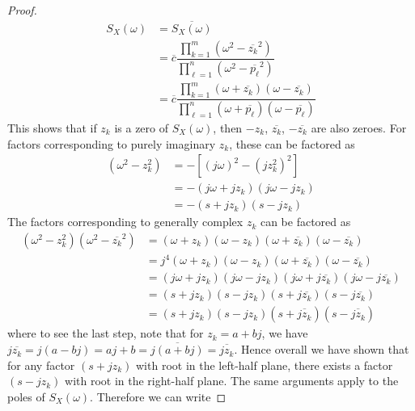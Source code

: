 \documentclass[11pt]{report} %
\begin{document}
\begin{proof}
\begin{align}
S_{X}\left(\omega\right) &= \overline{S_{X}\left(\omega\right)} \\
&= \overline{c}\dfrac{\prod_{k = 1}^{m}\left(\omega^{2} - \overline{z_{k}}^{2}\right)}{\prod_{\ell = 1}^{n}\left(\omega^{2} - \overline{p_{\ell}}^{2}\right)} \\
&= \overline{c}\dfrac{\prod_{k = 1}^{m}\left(\omega + \overline{z_{k}}\right)\left(\omega - \overline{z_{k}}\right)}{\prod_{\ell = 1}^{n}\left(\omega + \overline{p_{\ell}}\right)\left(\omega - \overline{p_{\ell}}\right)}
\end{align}
This shows that if $z_{k}$ is a zero of $S_{X}\left(\omega\right)$, then $-z_{k}$, $\overline{z_{k}}$, $-\overline{z_{k}}$ are also zeroes. For factors corresponding to purely imaginary $z_{k}$, these can be factored as
\begin{align}
\left(\omega^{2} - z_{k}^{2}\right) &= -\left[\left(j\omega\right)^{2} - \left(jz_{k}^{2}\right)^{2}\right] \\
&= -\left(j\omega + jz_{k}\right)\left(j\omega - jz_{k}\right) \\
&= -\left(s + jz_{k}\right)\left(s - jz_{k}\right)
\end{align}
The factors corresponding to generally complex $z_{k}$ can be factored as
\begin{align}
\left(\omega^{2} - z_{k}^{2}\right)\left(\omega^{2} - \overline{z_{k}}^{2}\right) &= \left(\omega + z_{k}\right)\left(\omega - z_{k}\right)\left(\omega + \overline{z_{k}}\right)\left(\omega - \overline{z_{k}}\right) \\
&= j^{4}\left(\omega + z_{k}\right)\left(\omega - z_{k}\right)\left(\omega + \overline{z_{k}}\right)\left(\omega - \overline{z_{k}}\right) \\
&= \left(j\omega + jz_{k}\right)\left(j\omega - jz_{k}\right)\left(j\omega + j\overline{z_{k}}\right)\left(j\omega - j\overline{z_{k}}\right) \\
&= \left(s + jz_{k}\right)\left(s - jz_{k}\right)\left(s + j\overline{z_{k}}\right)\left(s - j\overline{z_{k}}\right) \\
&= \left(s + jz_{k}\right)\left(s - jz_{k}\right)\left(s + \overline{jz_{k}}\right)\left(s - \overline{jz_{k}}\right)
\end{align}
where to see the last step, note that for $z_{k} = a + bj$, we have $j\overline{z_{k}} = j\left(a - bj\right) = aj + b = \overline{j\left(a + bj\right)} = \overline{jz_{k}}$. Hence overall we have shown that for any factor $\left(s + jz_{k}\right)$ with root in the left-half plane, there exists a factor $\left(s - jz_{k}\right)$ with root in the right-half plane. The same arguments apply to the poles of $S_{X}\left(\omega\right)$. Therefore we can write

\end{proof}
\end{document}
